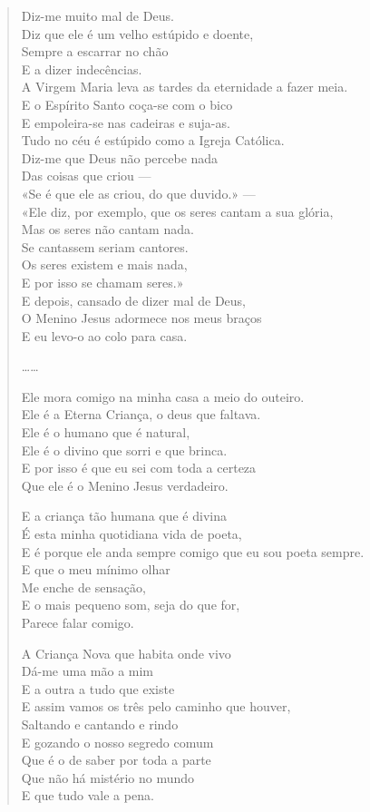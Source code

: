 \begin{verse}
Diz-me muito mal de Deus. \\
Diz que ele é um velho estúpido e doente, \\
Sempre a escarrar no chão \\
E a dizer indecências. \\
A Virgem Maria leva as tardes da eternidade a fazer meia. \\
E o Espírito Santo coça-se com o bico \\
E empoleira-se nas cadeiras e suja-as. \\
Tudo no céu é estúpido como a Igreja Católica. \\
Diz-me que Deus não percebe nada \\
Das coisas que criou — \\
«Se é que ele as criou, do que duvido.» — \\
«Ele diz, por exemplo, que os seres cantam a sua glória, \\
Mas os seres não cantam nada. \\
Se cantassem seriam cantores. \\
Os seres existem e mais nada, \\
E por isso se chamam seres.» \\
E depois, cansado de dizer mal de Deus, \\
O Menino Jesus adormece nos meus braços \\
E eu levo-o ao colo para casa.

……

Ele mora comigo na minha casa a meio do outeiro. \\
Ele é a Eterna Criança, o deus que faltava. \\
Ele é o humano que é natural, \\
Ele é o divino que sorri e que brinca. \\
E por isso é que eu sei com toda a certeza \\
Que ele é o Menino Jesus verdadeiro.

E a criança tão humana que é divina \\
É esta minha quotidiana vida de poeta, \\
E é porque ele anda sempre comigo que eu sou poeta sempre. \\
E que o meu mínimo olhar \\
Me enche de sensação, \\
E o mais pequeno som, seja do que for, \\
Parece falar comigo.

A Criança Nova que habita onde vivo \\
Dá-me uma mão a mim \\
E a outra a tudo que existe \\
E assim vamos os três pelo caminho que houver, \\
Saltando e cantando e rindo \\
E gozando o nosso segredo comum \\
Que é o de saber por toda a parte \\
Que não há mistério no mundo \\
E que tudo vale a pena.


\end{verse}
